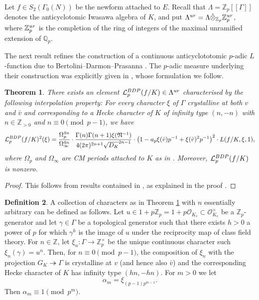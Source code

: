 \documentclass[10pt,reqno]{amsart}
\numberwithin{equation}{section}
\theoremstyle{plain}
\newtheorem{thm}{Theorem}[subsection] %
\theoremstyle{definition}
\newtheorem{defi}[thm]{Definition}
\theoremstyle{definition}
\theoremstyle{plain}
\theoremstyle{plain}
\theoremstyle{plain}
\theoremstyle{plain}
\theoremstyle{plain}
\theoremstyle{plain}
\newcommand{\Z}{\mathbb{Z}}
\newcommand{\Q}{\mathbb{Q}}
\newcommand{\Zp}{\mathbb{Z}_{p}}
\newcommand{\Lcal}{\mathcal{L}}
\begin{document}
Let $f\in S_2(\Gamma_0(N))$ be the newform attached to %
 $E$. Recall that $\Lambda=\Z_p[[\Gamma]]$ denotes the anticyclotomic Iwasawa algebra of $K$,  and put $\Lambda^{\rm ur}=\Lambda\hat\otimes_{\Z_p}\Z_p^{\rm ur}$, 
where $\Z_p^{\rm ur}$ is the completion of the ring of integers of the maximal unramified extension of $\Q_p$. 

The next result refines the construction of a continuous anticyclototomic $p$-adic $L$-function due to Bertolini--Darmon--Prasanna \cite{BDP}. The $p$-adic measure underlying their construction was explicitly given in \cite{cas-hsieh1}, whose formulation we follow.

\begin{thm}\label{thm:BDP}
There exists an element $\Lcal_p^{\rm BDP}(f/K)\in\Lambda^{\rm ur}$ characterised by the following interpolation property: For every character $\xi$ of $\Gamma$ crystalline at both $v$ and $\bar{v}$ and corresponding to a Hecke character of $K$ of infinity type $(n,-n)$ with $n\in\Z_{>0}$ and $n\equiv 0\pmod{p-1}$, we have
\[
\Lcal_p^{\rm BDP}(f/K)^2(\xi)=\frac{\Omega_p^{4n}}{\Omega_\infty^{4n}}\cdot\frac{\Gamma(n)\Gamma(n+1)\xi(\mathfrak{N}^{-1})}{4(2\pi)^{2n+1}\sqrt{D_K}^{2n-1}}\cdot\bigl(1-a_p\xi(\bar{v})p^{-1}+\xi(\bar{v})^2p^{-1}\bigr)^2\cdot L(f/K,\xi,1),
\]  
where $\Omega_p$ and $\Omega_\infty$ are CM periods attached to $K$ as in \cite[\S{2.5}]{cas-hsieh1}. Moreover, $\Lcal_p^{\rm BDP}(f/K)$ is nonzero.
\end{thm}

\begin{proof} 
This follows from results contained in \cite[\S{3}]{cas-hsieh1}, as explained in the proof \cite[Thm.\,2.1.1]{eisenstein}.
\end{proof}

\begin{defi}\label{def:alpha_m}
A collection of characters as in Theorem \ref{thm:BDP} with $n$ essentially arbitrary can be defined as follows. Let $u\in 1 + p\Zp = 1+p\mathcal{O}_{K_v}\subset \mathcal{O}_{K_v}^\times$ be a $\Zp$-generator and let $\gamma\in \Gamma$ be a topological generator such that there exists  $h>0$ a power of $p$ for which 
$\gamma^h$ is the image of $u$ under the reciprocity map of class field theory. For $n\in\Z$,  let 
$\xi_n: \Gamma \rightarrow \Z_p^\times$ be the unique continuous character such $\xi_n(\gamma) = u^n$.  Then, for $n\equiv 0 \pmod{p-1}$, the composition of $\xi_n$ with 
the projection $G_K\twoheadrightarrow \Gamma$ is crystalline at $v$ (and hence also $\bar v$) and the corresponding  Hecke character of $K$
has infinity type $(hn,-hn)$. 
For $m>0$ we let 
\[\alpha_m = \xi_{(p-1)p^{m-1}}.
\] 
Then $\alpha_m \equiv 1 \pmod{p^m}$.
\end{defi}
\end{document}
